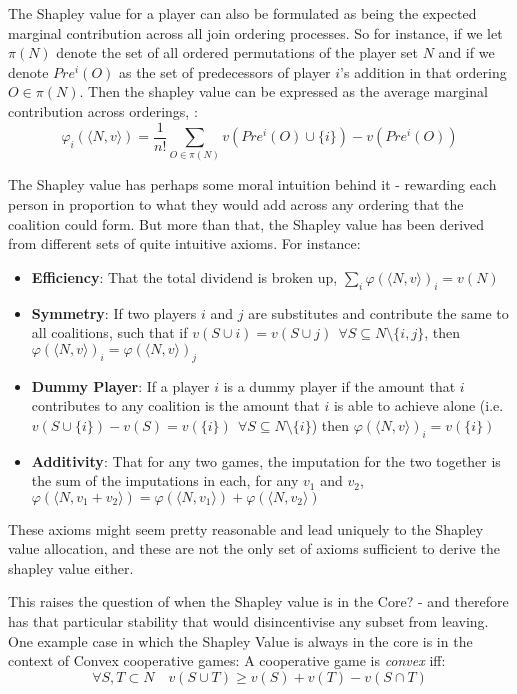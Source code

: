 The Shapley value for a player can also be formulated as being the expected marginal contribution across all join ordering processes.
So for instance, if we let $\pi(N)$ denote the set of all ordered permutations of the player set $N$ and if we denote $Pre^i(O)$ as the set of predecessors of player $i$'s addition in that ordering $O\in \pi(N)$. Then the shapley value can be expressed as the average marginal contribution across orderings, \cite{weber_1988}:
\begin{equation}
    \varphi_i(\langle N,v\rangle) = \frac{1}{n!}\sum_{O\in\pi(N)}v(Pre^i(O)\cup\{i\})-v(Pre^i(O))
\end{equation}

The Shapley value has perhaps some moral intuition behind it - rewarding each person in proportion to what they would add across any ordering that the coalition could form.
But more than that, the Shapley value has been derived from different sets of quite intuitive axioms.
For instance:

\begin{itemize}
\item	\textbf{Efficiency}: That the total dividend is broken up, $\sum_i\varphi(\langle N,v\rangle)_i = v(N)$
\item	\textbf{Symmetry}: If two players $i$ and $j$ are substitutes and contribute the same to all coalitions, such that if $v(S\cup i)=v(S\cup j)~~\forall S\subseteq N\setminus\{i,j\}$, then $\varphi(\langle N,v\rangle)_i = \varphi(\langle N,v\rangle)_j$
\item	\textbf{Dummy Player}: If a player $i$ is a dummy player if the amount that $i$ contributes to any coalition is the amount that $i$ is able to achieve alone (i.e.\ $v(S\cup \{i\})-v(S)=v(\{i\})~~\forall S\subseteq N\setminus\{i\}$) then $\varphi(\langle N,v\rangle)_i=v(\{i\})$
\item	\textbf{Additivity}: That for any two games, the imputation for the two together is the sum of the imputations in each, for any $v_1$ and $v_2$, $\varphi(\langle N,v_1+v_2\rangle)=\varphi(\langle N,v_1 \rangle) + \varphi(\langle N,v_2\rangle)$
\end{itemize}

These axioms might seem pretty reasonable and lead uniquely to the Shapley value allocation, and these are not the only set of axioms sufficient to derive the shapley value either.

This raises the question of when the Shapley value is in the Core? - and therefore has that particular stability that would disincentivise any subset from leaving.
One example case in which the Shapley Value is always in the core is in the context of Convex cooperative games:
A cooperative game is \textit{convex} iff:
\begin{equation}
    \forall S,T\subset N \quad v(S\cup T) \ge v(S)+v(T)-v(S\cap T)
\end{equation}

